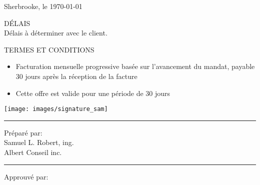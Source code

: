 \documentclass[12pt, letterpaper]{letter}
\begin{document}
\pagestyle{logo}
\begin{flushleft}

Sherbrooke, le \today \\
\vspace{0.5cm}

\end{flushleft}
\vspace{1cm}


\par


\par
\begin{samepage}

\end{samepage}

\par
DÉLAIS \\
Délais à déterminer avec le client.

\par
TERMES ET CONDITIONS
\begin{itemize}
    \item[\textbullet] Facturation mensuelle progressive basée sur l'avancement du mandat, payable 30 jours après la réception de la facture
    \item[\textbullet] Cette offre est valide pour une période de 30 jours
\end{itemize}

\begin{flushleft}
\noindent 
\parbox[b]{0.45\linewidth}{%
    \strut 
    \begin{center}
    \texttt{[image: images/signature\_sam]}
    \end{center}
    \hrule\vspace{0.5cm}
    Préparé par:\\
    Samuel L. Robert, ing.\\
    Albert Conseil inc.\\
} 
\hspace{0.05\linewidth} %
\parbox[b]{0.45\linewidth}{%
    \strut 
    \vspace*{1.5cm}
    \hrule\vspace{0.5cm}
    Approuvé par:\\
    }
\end{flushleft}
\par\vspace{1cm} 
\end{document}
